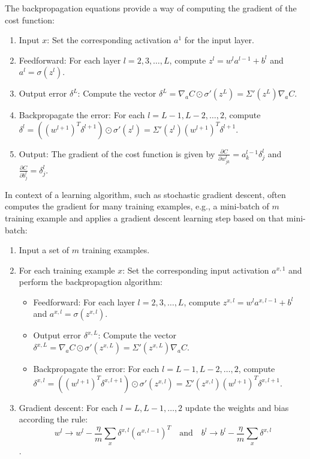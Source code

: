 \documentclass[]{book}
\begin{document}
The backpropagation equations provide a way of computing the gradient of
the cost function:

\begin{enumerate}
\def\labelenumi{\arabic{enumi}.}
\item
  Input \(x\): Set the corresponding activation \(a^1\) for the input
  layer.
\item
  Feedforward: For each layer \(l = 2, 3, \ldots, L\), compute
  \(z^l = w^l a^{l-1} + b^l\) and \(a^l = \sigma(z^l)\).
\item
  Output error \(\delta^L\): Compute the vector
  \(\delta^L = \nabla_a C \odot \sigma'(z^L) = \Sigma'(z^L) \nabla_a C\).
\item
  Backpropagate the error: For each \(l = L -1, L - 2, \ldots, 2\),
  compute
  \(\delta^l = ((w^{l+1})^T \delta^{l+1}) \odot \sigma'(z^l) = \Sigma'(z^l) (w^{l+1})^T \delta^{l+1}\).
\item
  Output: The gradient of the cost function is given by
  \(\displaystyle \frac{\partial C}{\partial w^l_{jk}} = a^{l-1}_k \delta^l_j\)
  and \(\displaystyle \frac{\partial C}{\partial b^l_j} = \delta^l_j\).
\end{enumerate}

In context of a learning algorithm, such as stochastic gradient descent,
often computes the gradient for many training examples, e.g., a
mini-batch of \(m\) training example and applies a gradient descent
learning step based on that mini-batch:

\begin{enumerate}
\def\labelenumi{\arabic{enumi}.}
\item
  Input a set of \(m\) training examples.
\item
  For each training example \(x\): Set the corresponding input
  activation \(a^{x, 1}\) and perform the backpropagtion algorithm:

  \begin{itemize}
  \item
    Feedforward: For each layer \(l = 2, 3, \ldots, L\), compute
    \(z^{x, l} = w^l a^{x, l-1} + b^l\) and
    \(a^{x, l} = \sigma(z^{x, l})\).
  \item
    Output error \(\delta^{x, L}\): Compute the vector
    \(\delta^{x, L} = \nabla_a C \odot \sigma'(z^{x, L}) = \Sigma'(z^{x, L}) \nabla_a C\).
  \item
    Backpropagate the error: For each \(l = L -1, L - 2, \ldots, 2\),
    compute
    \(\delta^{x, l} = ((w^{l+1})^T \delta^{x, l+1}) \odot \sigma'(z^{x, l}) = \Sigma'(z^{x, l}) (w^{l+1})^T \delta^{x, l+1}\).
  \end{itemize}
\item
  Gradient descent: For each \(l = L, L - 1, \ldots, 2\) update the
  weights and bias according the rule:
  \[w^l \rightarrow w^l-\frac{\eta}{m} \sum_x \delta^{x,l} (a^{x,l-1})^T  \quad\mbox{and}\quad b^l \rightarrow b^l-\frac{\eta}{m} \sum_x \delta^{x,l}\].
\end{enumerate}
\end{document}
